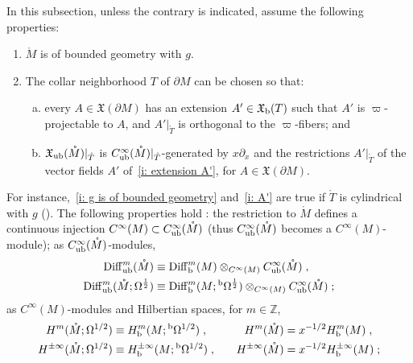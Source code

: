 \documentclass{memo-l}
\theoremstyle{plain}
\theoremstyle{definition}
\theoremstyle{remark}
\newcommand{\Z}{\mathbb{Z}}
\newcommand{\fX}{\mathfrak{X}}
\newcommand{\Diff}{\operatorname{Diff}}
\newcommand{\bOmega}{{}^{\text{\rm b}}\Omega}
\newcommand{\Diffb}{\Diff_{\text{\rm b}}}
\newcommand{\Hb}{H_{\text{\rm b}}}
\newcommand{\Diffub}{\Diff_{\text{\rm ub}}}
\newcommand{\Cinftyub}{C^\infty_{\text{\rm ub}}}
\newcommand{\fXub}{\fX_{\text{\rm ub}}}
\newcommand{\fXb}{\fX_{\text{\rm b}}}
\numberwithin{section}{chapter}
\numberwithin{equation}{section}%
\begin{document}
In this subsection, unless the contrary is indicated, assume the following properties:
\begin{enumerate}[{\rm(A)}]

\item\label{i: g is of bounded geometry} $\mathring M$ is of bounded geometry with $g$.

\item\label{i: A'}  The collar neighborhood $T$ of $\partial M$ can be chosen so that:
\begin{enumerate}[(a)]

\item\label{i: extension A'} every $A\in\fX(\partial M)$ has an extension $A'\in\fXb(T)$ such that $A'$ is $\varpi$-projectable to $A$, and $A'|_{\mathring T}$ is orthogonal to the $\varpi$-fibers; and

\item\label{i: fX_ub(mathring M)|_mathring T is generated by x partial_x and the vector fields A'} $\fXub(\mathring M)|_{\mathring T}$ is $\Cinftyub(\mathring M)|_{\mathring T}$-generated by $x\partial_x$ and the restrictions $A'|_{\mathring T}$ of the vector fields $A'$ of~\ref{i: extension A'}, for $A\in\fX(\partial M)$.

\end{enumerate}
\end{enumerate}
For instance,~\ref{i: g is of bounded geometry} and~\ref{i: A'} are true if $\mathring T$ is cylindrical with $g$ (). The following properties hold \cite[Corollaries~6.32,~6.34,~6.35,~6.37,~6.38 and~6.40 and Propositions~6.33 and~6.36]{AlvKordyLeichtnam-conormal}: the restriction to $\mathring M$ defines a continuous injection $C^\infty(M)\subset\Cinftyub(\mathring M)$ (thus $\Cinftyub(\mathring M)$ becomes a $C^\infty(M)$-module); as $\Cinftyub(\mathring M)$-modules,
\begin{align*}
\Diffub^m(\mathring M)&\equiv\Diffb^m(M)\otimes_{C^\infty(M)}\Cinftyub(\mathring M)\;,\\
\Diffub^m(\mathring M;\Omega^{\frac12})&\equiv\Diffb^m(M;\bOmega^{\frac12})\otimes_{C^\infty(M)}\Cinftyub(\mathring M)\;;
\end{align*}
as $C^\infty(M)$-modules and Hilbertian spaces, for $m\in\Z$,
\begin{alignat*}{2}
H^m(\mathring M;\Omega^{1/2})&\equiv\Hb^m(M;\bOmega^{1/2})\;,&\quad
H^m(\mathring M)&=x^{-1/2}\Hb^m(M)\;,\\
H^{\pm\infty}(\mathring M;\Omega^{1/2})&\equiv\Hb^{\pm\infty}(M;\bOmega^{1/2})\;,&\quad
H^{\pm\infty}(\mathring M)&=x^{-1/2}\Hb^{\pm\infty}(M)\;;
\end{alignat*}
\end{document}
